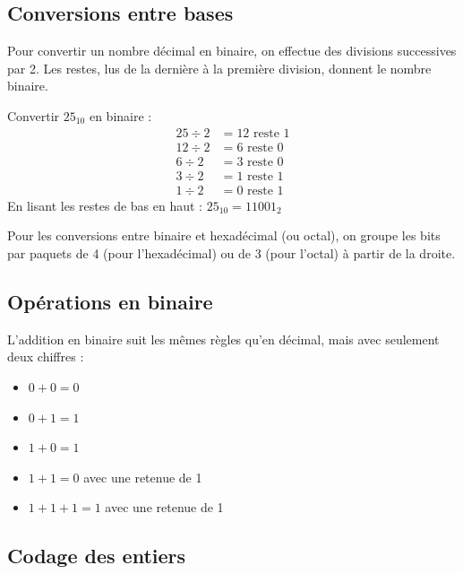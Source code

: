 \subsection{Conversions entre bases}

\begin{propriete}
Pour convertir un nombre décimal en binaire, on effectue des divisions successives par 2. Les restes, lus de la dernière à la première division, donnent le nombre binaire.
\end{propriete}

\begin{exemple}
Convertir $25_{10}$ en binaire :
\begin{align*}
25 \div 2 &= 12 \text{ reste } 1 \\
12 \div 2 &= 6 \text{ reste } 0 \\
6 \div 2 &= 3 \text{ reste } 0 \\
3 \div 2 &= 1 \text{ reste } 1 \\
1 \div 2 &= 0 \text{ reste } 1
\end{align*}
En lisant les restes de bas en haut : $25_{10} = 11001_2$
\end{exemple}

\begin{aretenir}
Pour les conversions entre binaire et hexadécimal (ou octal), on groupe les bits par paquets de 4 (pour l'hexadécimal) ou de 3 (pour l'octal) à partir de la droite.
\end{aretenir}

\subsection{Opérations en binaire}

\begin{definition}
L'addition en binaire suit les mêmes règles qu'en décimal, mais avec seulement deux chiffres :
\begin{itemize}
    \item $0 + 0 = 0$
    \item $0 + 1 = 1$
    \item $1 + 0 = 1$
    \item $1 + 1 = 0$ avec une retenue de 1
    \item $1 + 1 + 1 = 1$ avec une retenue de 1
\end{itemize}
\end{definition}

\subsection{Codage des entiers}

